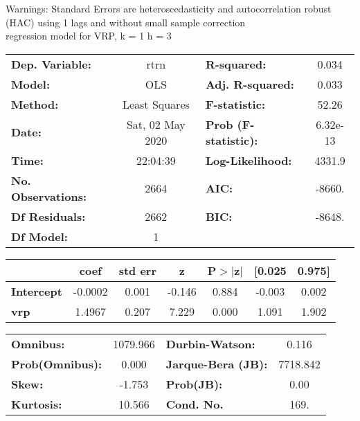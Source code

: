 Warnings: \newline
 [1] Standard Errors are heteroscedasticity and autocorrelation robust (HAC) using 1 lags and without small sample correction\\ 

regression model for VRP, k = 1 h = 3\begin{center}
\begin{tabular}{lclc}
\toprule
\textbf{Dep. Variable:}    &       rtrn       & \textbf{  R-squared:         } &     0.034   \\
\textbf{Model:}            &       OLS        & \textbf{  Adj. R-squared:    } &     0.033   \\
\textbf{Method:}           &  Least Squares   & \textbf{  F-statistic:       } &     52.26   \\
\textbf{Date:}             & Sat, 02 May 2020 & \textbf{  Prob (F-statistic):} &  6.32e-13   \\
\textbf{Time:}             &     22:04:39     & \textbf{  Log-Likelihood:    } &    4331.9   \\
\textbf{No. Observations:} &        2664      & \textbf{  AIC:               } &    -8660.   \\
\textbf{Df Residuals:}     &        2662      & \textbf{  BIC:               } &    -8648.   \\
\textbf{Df Model:}         &           1      & \textbf{                     } &             \\
\bottomrule
\end{tabular}
\begin{tabular}{lcccccc}
                   & \textbf{coef} & \textbf{std err} & \textbf{z} & \textbf{P$> |$z$|$} & \textbf{[0.025} & \textbf{0.975]}  \\
\midrule
\textbf{Intercept} &      -0.0002  &        0.001     &    -0.146  &         0.884        &       -0.003    &        0.002     \\
\textbf{vrp}       &       1.4967  &        0.207     &     7.229  &         0.000        &        1.091    &        1.902     \\
\bottomrule
\end{tabular}
\begin{tabular}{lclc}
\textbf{Omnibus:}       & 1079.966 & \textbf{  Durbin-Watson:     } &    0.116  \\
\textbf{Prob(Omnibus):} &   0.000  & \textbf{  Jarque-Bera (JB):  } & 7718.842  \\
\textbf{Skew:}          &  -1.753  & \textbf{  Prob(JB):          } &     0.00  \\
\textbf{Kurtosis:}      &  10.566  & \textbf{  Cond. No.          } &     169.  \\
\bottomrule
\end{tabular}
\end{center}

